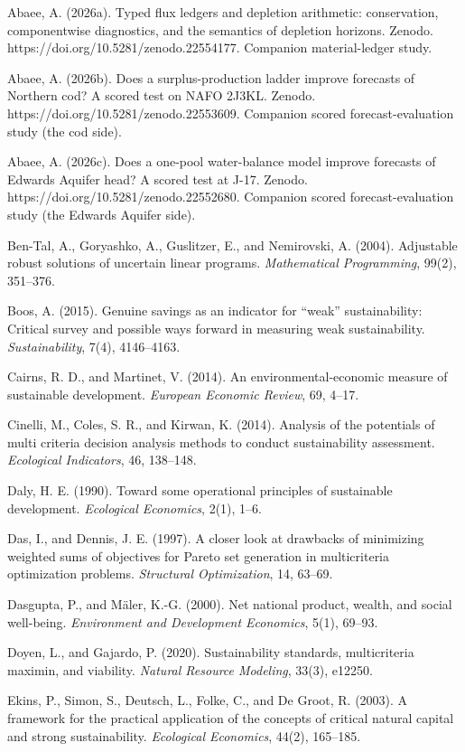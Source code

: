 \documentclass[11pt]{article}
\begin{document}
Abaee, A. (2026a). Typed flux ledgers and depletion arithmetic:
conservation, componentwise diagnostics, and the semantics of depletion
horizons. Zenodo. https://doi.org/10.5281/zenodo.22554177. Companion
material-ledger study.

Abaee, A. (2026b). Does a surplus-production ladder improve forecasts of
Northern cod? A scored test on NAFO 2J3KL. Zenodo.
https://doi.org/10.5281/zenodo.22553609. Companion scored
forecast-evaluation study (the cod side).

Abaee, A. (2026c). Does a one-pool water-balance model improve forecasts
of Edwards Aquifer head? A scored test at J-17. Zenodo.
https://doi.org/10.5281/zenodo.22552680. Companion scored
forecast-evaluation study (the Edwards Aquifer side).

Ben-Tal, A., Goryashko, A., Guslitzer, E., and Nemirovski, A. (2004).
Adjustable robust solutions of uncertain linear programs.
\emph{Mathematical Programming}, 99(2), 351--376.

Boos, A. (2015). Genuine savings as an indicator for ``weak''
sustainability: Critical survey and possible ways forward in measuring
weak sustainability. \emph{Sustainability}, 7(4), 4146--4163.

Cairns, R. D., and Martinet, V. (2014). An environmental-economic
measure of sustainable development. \emph{European Economic Review}, 69,
4--17.

Cinelli, M., Coles, S. R., and Kirwan, K. (2014). Analysis of the
potentials of multi criteria decision analysis methods to conduct
sustainability assessment. \emph{Ecological Indicators}, 46, 138--148.

Daly, H. E. (1990). Toward some operational principles of sustainable
development. \emph{Ecological Economics}, 2(1), 1--6.

Das, I., and Dennis, J. E. (1997). A closer look at drawbacks of
minimizing weighted sums of objectives for Pareto set generation in
multicriteria optimization problems. \emph{Structural Optimization}, 14,
63--69.

Dasgupta, P., and M\"aler, K.-G. (2000). Net national product, wealth, and
social well-being. \emph{Environment and Development Economics}, 5(1),
69--93.

Doyen, L., and Gajardo, P. (2020). Sustainability standards,
multicriteria maximin, and viability. \emph{Natural Resource Modeling},
33(3), e12250.

Ekins, P., Simon, S., Deutsch, L., Folke, C., and De Groot, R. (2003). A
framework for the practical application of the concepts of critical
natural capital and strong sustainability. \emph{Ecological Economics},
44(2), 165--185.
\end{document}
